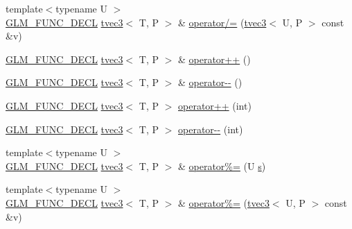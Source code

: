 \begin{DoxyCompactItemize}
\item 
{\footnotesize template$<$typename U $>$ }\\\hyperlink{setup_8hpp_ab2d052de21a70539923e9bcbf6e83a51}{G\+L\+M\+\_\+\+F\+U\+N\+C\+\_\+\+D\+E\+CL} \hyperlink{structglm_1_1detail_1_1tvec3}{tvec3}$<$ T, P $>$ \& \hyperlink{structglm_1_1detail_1_1tvec3_af5f48f8e468b7941eff35170d5e10cab}{operator/=} (\hyperlink{structglm_1_1detail_1_1tvec3}{tvec3}$<$ U, P $>$ const \&v)
\item 
\hyperlink{setup_8hpp_ab2d052de21a70539923e9bcbf6e83a51}{G\+L\+M\+\_\+\+F\+U\+N\+C\+\_\+\+D\+E\+CL} \hyperlink{structglm_1_1detail_1_1tvec3}{tvec3}$<$ T, P $>$ \& \hyperlink{structglm_1_1detail_1_1tvec3_a01056db42bfb77a320bf3516ea4951b4}{operator++} ()
\item 
\hyperlink{setup_8hpp_ab2d052de21a70539923e9bcbf6e83a51}{G\+L\+M\+\_\+\+F\+U\+N\+C\+\_\+\+D\+E\+CL} \hyperlink{structglm_1_1detail_1_1tvec3}{tvec3}$<$ T, P $>$ \& \hyperlink{structglm_1_1detail_1_1tvec3_aaafe373e142ed03ab8e8d550cd660353}{operator-\/-\/} ()
\item 
\hyperlink{setup_8hpp_ab2d052de21a70539923e9bcbf6e83a51}{G\+L\+M\+\_\+\+F\+U\+N\+C\+\_\+\+D\+E\+CL} \hyperlink{structglm_1_1detail_1_1tvec3}{tvec3}$<$ T, P $>$ \hyperlink{structglm_1_1detail_1_1tvec3_a4cce0be26db53a9360fbfbe700c5b746}{operator++} (int)
\item 
\hyperlink{setup_8hpp_ab2d052de21a70539923e9bcbf6e83a51}{G\+L\+M\+\_\+\+F\+U\+N\+C\+\_\+\+D\+E\+CL} \hyperlink{structglm_1_1detail_1_1tvec3}{tvec3}$<$ T, P $>$ \hyperlink{structglm_1_1detail_1_1tvec3_a3e9d395ca33b49731052df266e08433b}{operator-\/-\/} (int)
\item 
{\footnotesize template$<$typename U $>$ }\\\hyperlink{setup_8hpp_ab2d052de21a70539923e9bcbf6e83a51}{G\+L\+M\+\_\+\+F\+U\+N\+C\+\_\+\+D\+E\+CL} \hyperlink{structglm_1_1detail_1_1tvec3}{tvec3}$<$ T, P $>$ \& \hyperlink{structglm_1_1detail_1_1tvec3_a96e6e5efb8b0d0f589345e6d5180e013}{operator\%=} (U \hyperlink{structglm_1_1detail_1_1tvec3_aa7906d8cd1a54c96ba22c1f97ebaf7cc}{s})
\item 
{\footnotesize template$<$typename U $>$ }\\\hyperlink{setup_8hpp_ab2d052de21a70539923e9bcbf6e83a51}{G\+L\+M\+\_\+\+F\+U\+N\+C\+\_\+\+D\+E\+CL} \hyperlink{structglm_1_1detail_1_1tvec3}{tvec3}$<$ T, P $>$ \& \hyperlink{structglm_1_1detail_1_1tvec3_ad99c15901cce70147d1264b4ee5f57fd}{operator\%=} (\hyperlink{structglm_1_1detail_1_1tvec3}{tvec3}$<$ U, P $>$ const \&v)
\item 

\end{DoxyCompactItemize}
